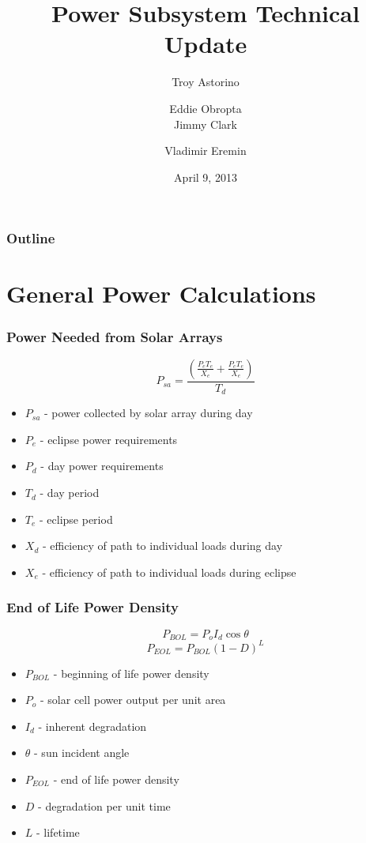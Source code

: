 \documentclass{beamer}
\title{Power Subsystem Technical Update}
\author{Troy Astorino \and Eddie Obropta \\ Jimmy Clark \and Vladimir Eremin}
\date{April 9, 2013}
\institute[16.83 -- MIT]{Space Systems Design \\ Massachusetts Institute of
  Technology}
\begin{document}
\begin{frame}
\maketitle
\end{frame}

\begin{frame}
  \frametitle{Outline}
  \tableofcontents
\end{frame}

\section{General Power Calculations}
\begin{frame}
  \frametitle{Power Needed from Solar Arrays}
  \[P_{sa} = \frac{\left(\frac{P_e T_e}{X_e} + \frac{P_e
        T_e}{X_e}\right)}{T_d}\]

  \begin{itemize}
    \item $P_{sa}$ - power collected by solar array during day
    \item $P_e$ - eclipse power requirements
    \item $P_d$ - day power requirements
    \item $T_d$ - day period
    \item $T_e$ - eclipse period
    \item $X_d$ - efficiency of path to individual loads during day
    \item $X_e$ - efficiency of path to individual loads during eclipse
  \end{itemize}
\end{frame}

\begin{frame}
  \frametitle{End of Life Power Density}
  \[P_{BOL} = P_o I_d \cos{\theta}\]
  \[P_{EOL} = P_{BOL} (1 - D)^L\]

  \begin{itemize}
    \item $P_{BOL}$ - beginning of life power density
    \item $P_o$ - solar cell power output per unit area
    \item $I_d$ - inherent degradation
    \item $\theta$ - sun incident angle
    \item $P_{EOL}$ - end of life power density
    \item $D$ - degradation per unit time
    \item $L$ - lifetime
  \end{itemize}
\end{frame}
\end{document}
